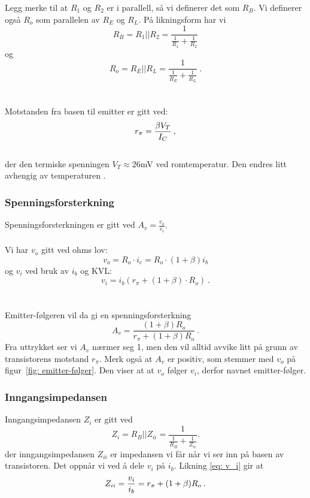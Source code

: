 \documentclass[a4paper,11pt,norsk]{article}
\begin{document}
Legg merke til at $R_1$ og $R_2$ er i parallell, så vi definerer det som $R_B$. Vi definerer også $R_{o}$ som parallelen av $R_E$ og $R_L$. På likningsform har vi
\begin{equation} \label{eq: R_B}
    R_B = R_1 || R_2 = \frac{1}{\frac{1}{R_1} + \frac{1}{R_2}}
\end{equation}
og
\begin{equation} \label{eq: R_o}
    R_o = R_E || R_L = \frac{1}{\frac{1}{R_E} + \frac{1}{R_L}} \: .
\end{equation}
\\\\
Motstanden fra basen til emitter er gitt ved:
\begin{equation} \label{eq: r_{pi}}
    r_\pi = \frac{\beta V_T}{I_C} \: ,
\end{equation}\\
der den termiske spenningen $V_T \approx 26$mV ved romtemperatur. Den endres litt avhengig av temperaturen \cite{Thermal Voltage}.
\newpage

\subsubsection{Spenningsforsterkning}
Spenningsforsterkningen er gitt ved $A_v = \frac{v_o}{v_i}$. \\\\
Vi har $v_o$ gitt ved ohms lov:
\begin{equation} \label{eq: v_o}
    v_o = R_o \cdot i_e = R_o\cdot(1+\beta)i_b
\end{equation}
og $v_i$ ved bruk av $i_b$ og KVL:
\begin{equation}\label{eq: v_i} \label{eq: v_i}
    v_i = i_b\left(r_\pi + (1+\beta) \cdot R_o \right)\:.
\end{equation}
\\\\
Emitter-følgeren vil da gi en spenningsforsterkning
\begin{equation} \label{eq: A_v}
    A_v = \frac{(1+\beta)R_o}{r_\pi + (1+\beta)R_o} \:.
\end{equation}
Fra uttrykket ser vi $A_v$ nærmer seg 1, men den vil alltid avvike litt på grunn av transistorens motstand $r_\pi$. Merk også at $A_v$ er positiv, som stemmer med $v_o$ på figur~\ref{fig: emitter-følger}. Den viser at at $v_o$ følger $v_i$, derfor navnet emitter-følger.


\subsubsection{Inngangsimpedansen}
\label{subsec: inngangsimpedans}
Inngangsimpedansen $Z_i$ er gitt ved
\begin{equation} \label{eq: Z_i}
    Z_i = R_B || Z_{ii} = \frac{1}{\frac{1}{R_B} + \frac{1}{Z_{ii}}}.
\end{equation}
der inngangsimpedansen $Z_{ii}$ er impedansen vi får når vi ser inn på basen av transistoren. Det oppnår vi ved å dele $v_i$ på $i_b$. Likning \ref{eq: v_i} gir at
\begin{equation} \label{eq: Z_{ii}}
    Z_{ii} = \frac{v_i}{i_b} = r_\pi + (1+\beta)R_o \:.
\end{equation}
\end{document}
